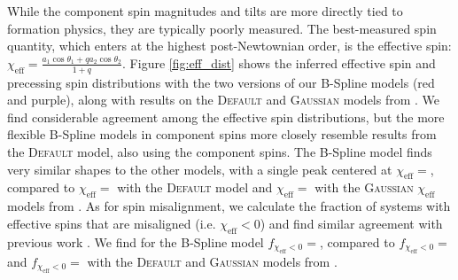 
While the component spin magnitudes and tilts are more directly tied to formation physics, they are typically poorly measured.  The best-measured spin quantity, which enters at the highest post-Newtownian order, is the effective spin: $\chi_\mathrm{eff} = \frac{a_1\cos{\theta_1} + qa_2\cos{\theta_2}}{1+q}$. Figure \ref{fig:eff_dist} 
shows the inferred effective spin and precessing spin distributions with the two versions of our B-Spline models (red and purple), 
along with results on the \textsc{Default} \citep{Talbot_2017} and \textsc{Gaussian} \citep{Miller2020} models from \citet{o3b_astro_dist}. We find considerable agreement 
among the effective spin distributions, but the more flexible B-Spline models in component spins more closely resemble results from the \textsc{Default} model, also using the component spins. The B-Spline model finds very similar shapes to the other models, with a single peak centered at 
$\chi_\mathrm{eff}=$\result{$\CIPlusMinus{\macros[ChiEffective][iid][PeakChiEff]}$}, compared to 
$\chi_\mathrm{eff}=$\result{$\CIPlusMinus{\macros[ChiEffective][default][PeakChiEff]}$} with the \textsc{Default} model and 
$\chi_\mathrm{eff}=$\result{$\CIPlusMinus{\macros[ChiEffective][gaussian][PeakChiEff]}$} with the \textsc{Gaussian} $\chi_\mathrm{eff}$ models from \citet{o3b_astro_dist}. 
As for spin misalignment, we calculate the fraction of systems with effective spins that are misaligned (i.e. $\chi_\mathrm{eff}<0$) and find similar 
agreement with previous work \citep{o3a_pop,o3b_astro_dist,Callister_NoEvidence}. We find for the B-Spline model 
$f_{\chi_\mathrm{eff}<0}=$\result{$\CIPlusMinus{\macros[ChiEffective][iid][FracBelow0]}$}, compared to 
$f_{\chi_\mathrm{eff}<0}=$\result{$\CIPlusMinus{\macros[ChiEffective][default][FracBelow0]}$} and $f_{\chi_\mathrm{eff}<0}=$\result{$\CIPlusMinus{\macros[ChiEffective][gaussian][FracBelow0]}$} 
with the \textsc{Default} and \textsc{Gaussian} models from \citet{o3b_astro_dist}.

